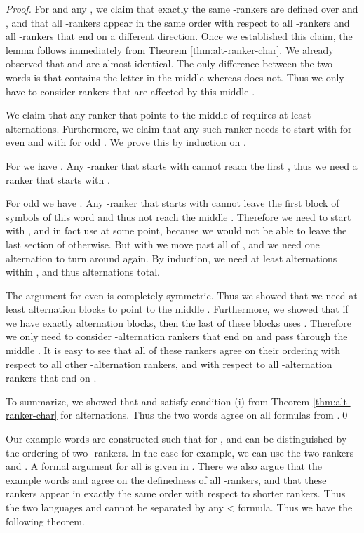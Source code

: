 \documentclass{LMCS}
\newcommand{\qedconf}{}
\renewcommand{\qedconf}{\qed}
\begin{document}
\begin{full}
\begin{proof}
  For  and any , we claim that exactly the same
  -rankers are defined over  and , and that all
  -rankers appear in the same order with respect to all
  -rankers and all -rankers that end on a different
  direction. Once we established this claim, the lemma follows immediately
  from Theorem \ref{thm:alt-ranker-char}. We already observed that 
  and  are almost identical. The only difference between the two
  words is that  contains the letter  in the middle whereas
   does not. Thus we only have to consider rankers that are
  affected by this middle .

  We claim that any ranker that points to the middle  of 
  requires at least  alternations. Furthermore, we claim that any such
  ranker needs to start with  for even  and with  for
  odd . We prove this by induction on .

  For  we have . Any -ranker that starts
  with  cannot reach the first , thus we need a ranker that
  starts with .

  For odd  we have . Any
  -ranker that starts with  cannot leave the first block of  symbols of this word and thus not reach the middle .
  Therefore we need to start with , and in fact use
   at some point, because we would not be able to leave
  the last section of  otherwise. But with  we
  move past all of , and we need one alternation to turn around
  again. By induction, we need at least  alternations within
  , and thus  alternations total.

  The argument for even  is completely symmetric. Thus we showed that we
  need at least  alternation blocks to point to the middle .
  Furthermore, we showed that if we have exactly  alternation blocks,
  then the last of these blocks uses .
  Therefore we only need to consider
  -alternation rankers that end on  and pass through the
  middle . It is easy to see that all of these rankers agree on their
  ordering with respect to all other -alternation rankers, and with
  respect to all -alternation rankers that end on .

  To summarize, we showed that  and  satisfy condition (i)
  from Theorem \ref{thm:alt-ranker-char} for  alternations. Thus the
  two words agree on all formulas from .\qedconf
\end{proof}
\end{full}

\begin{conference}
  Our example words are constructed such that for ,  and
   can be distinguished by the ordering of two -rankers. In
  the case  for example, we can use the two rankers  and . A
  formal argument for all  is given in \cite{WI07}. There we also argue
  that the example words  and 
  agree on the definedness of all -rankers, and that these rankers
  appear in exactly the same order with respect to shorter rankers. Thus
  the two languages  and  cannot be separated by any
  < formula. Thus we have the following theorem.
\end{conference}
\end{document}
